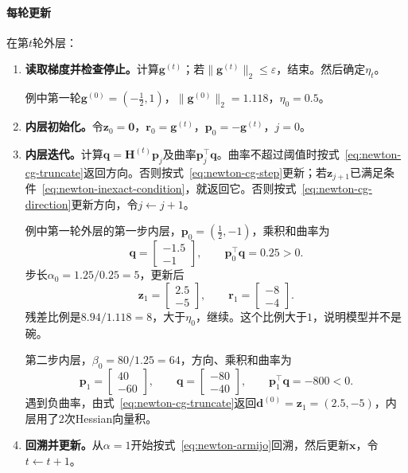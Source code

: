 \paragraph{每轮更新}
在第$t$轮外层：
\begin{enumerate}
 \item \textbf{读取梯度并检查停止。}计算$\bm{g}^{(t)}$；若$\lVert\bm{g}^{(t)}\rVert_2\leq\varepsilon$，结束。然后确定$\eta_t$。

 例中第一轮$\bm{g}^{(0)}=(-\tfrac12,1)$，$\lVert\bm{g}^{(0)}\rVert_2=1.118$，$\eta_0=0.5$。

 \item \textbf{内层初始化。}令$\bm{z}_0=\bm{0}$，$\bm{r}_0=\bm{g}^{(t)}$，$\bm{p}_0=-\bm{g}^{(t)}$，$j=0$。

 \item \textbf{内层迭代。}计算$\bm{q}=\bm{H}^{(t)}\bm{p}_j$及曲率$\bm{p}_j^\top\bm{q}$。曲率不超过阈值时按式~\eqref{eq:newton-cg-truncate}返回方向。否则按式~\eqref{eq:newton-cg-step}更新；若$\bm{z}_{j+1}$已满足条件~\eqref{eq:newton-inexact-condition}，就返回它。否则按式~\eqref{eq:newton-cg-direction}更新方向，令$j\leftarrow j+1$。

 例中第一轮外层的第一步内层，$\bm{p}_0=(\tfrac12,-1)$，乘积和曲率为
 \[
  \bm{q}=\begin{bmatrix}-1.5\\-1\end{bmatrix},\qquad \bm{p}_0^\top\bm{q}=0.25>0.
 \]
 步长$\alpha_0=1.25/0.25=5$，更新后
 \[
  \bm{z}_1=\begin{bmatrix}2.5\\-5\end{bmatrix},\qquad \bm{r}_1=\begin{bmatrix}-8\\-4\end{bmatrix}.
 \]
 残差比例是$8.94/1.118=8$，大于$\eta_0$，继续。这个比例大于$1$，说明模型并不是碗。

 第二步内层，$\beta_0=80/1.25=64$，方向、乘积和曲率为
 \[
  \bm{p}_1=\begin{bmatrix}40\\-60\end{bmatrix},\qquad
  \bm{q}=\begin{bmatrix}-80\\-40\end{bmatrix},\qquad
  \bm{p}_1^\top\bm{q}=-800<0.
 \]
 遇到负曲率，由式~\eqref{eq:newton-cg-truncate}返回$\bm{d}^{(0)}=\bm{z}_1=(2.5,-5)$，内层用了$2$次Hessian向量积。

 \item \textbf{回溯并更新。}从$\alpha=1$开始按式~\eqref{eq:newton-armijo}回溯，然后更新$\bm{x}$，令$t\leftarrow t+1$。


\end{enumerate}
